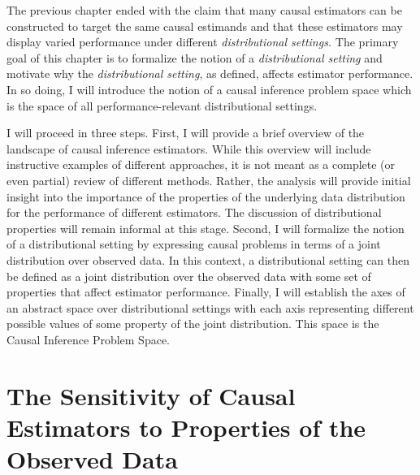\documentclass[../main.tex]{subfiles}
\begin{document}
The previous chapter ended with the claim that many causal estimators can be constructed to target the same causal estimands and that these estimators may display varied performance under different \textit{distributional settings. }The primary goal of this chapter is to formalize the notion of a \textit{distributional setting }and motivate why the \textit{distributional setting}, as defined, affects estimator performance. In so doing, I will introduce the notion of a causal inference problem space which is the space of all performance-relevant distributional settings.\par

\vspace{\baselineskip}
I will proceed in three steps. First, I will provide a brief overview of the landscape of causal inference estimators. While this overview will include instructive examples of different approaches, it is not meant as a complete (or even partial) review of different methods. Rather, the analysis will provide initial insight into the importance of the properties of the underlying data distribution for the performance of different estimators. The discussion of distributional properties will remain informal at this stage. Second, I will formalize the notion of a distributional setting by expressing causal problems in terms of a joint distribution over observed data. In this context, a distributional setting can then be defined as a joint distribution over the observed data with some set of properties that affect estimator performance. Finally, I will establish the axes of an abstract space over distributional settings with each axis representing different possible values of some property of the joint distribution. This space is the Causal Inference Problem Space.\par

\section{The Sensitivity of Causal Estimators to Properties of the Observed Data}
\end{document}
